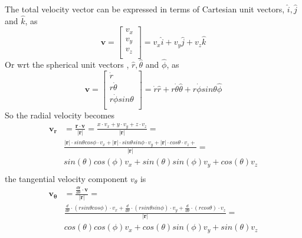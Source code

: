 The total velocity vector can be expressed in terms of Cartesian unit vectors, $\hat{i} , \hat{j}$ and $\hat{k}$, as 
\begin{equation}
     \boldsymbol{v}=\begin{bmatrix}
         v_x \\
         v_y \\
         v_z\\
        \end{bmatrix}
        = v_x\hat{i}+v_y\hat{j}+v_z\hat{k}
\end{equation}
Or wrt the spherical unit vectors , $\hat{r} , \hat{\theta}$ and $\hat{\phi}$, as 
\begin{equation}
     \boldsymbol{v}=\begin{bmatrix}
         \dot{r} \\
         r\dot{\theta} \\
         r\dot{\phi}sin\theta \\
        \end{bmatrix}
        = \dot{r}\hat{r}+r\dot{\theta}\hat{\theta}+r\dot{\phi}sin\theta\hat{\phi}
\end{equation}
So the radial velocity becomes
\begin{equation}
\begin{aligned}
\boldsymbol{v_r} &= \frac{\boldsymbol{r}\cdot \boldsymbol{v}}{|\boldsymbol{r}|} = \frac{x\cdot v_x + y\cdot v_y + z\cdot v_z}{|\boldsymbol{r}|} =\\
& \frac{|\boldsymbol{r}| \cdot sin\theta cos\phi \cdot v_x + |\boldsymbol{r}| \cdot sin\theta sin\phi \cdot v_y + |\boldsymbol{r}| \cdot cos\theta  \cdot v_z + }{|\boldsymbol{r}|} =\\
& sin(\theta)cos(\phi)v_x + sin(\theta)sin(\phi)v_y+ cos(\theta)v_z  \\
\end{aligned}
\end{equation}
the tangential velocity component $ v_{\theta}$ is
\begin{equation}
\begin{aligned}
\boldsymbol{v_{\theta}} &= 
\frac{\frac{d\boldsymbol{r}}{d\theta} \cdot \boldsymbol{v}}{|\boldsymbol{r}|} = \\
&\frac{\frac{d}{d\theta} \cdot (r sin\theta cos\phi)\cdot v_x + 
\frac{d}{d\theta} \cdot (r sin\theta sin\phi)\cdot v_y + 
\frac{d}{d\theta} \cdot (r cos\theta)\cdot v_z}{|\boldsymbol{r}|} = \\
&cos(\theta)cos(\phi)v_x + cos(\theta)sin(\phi)v_y + sin(\theta)v_z  \\
\end{aligned}
\end{equation}
